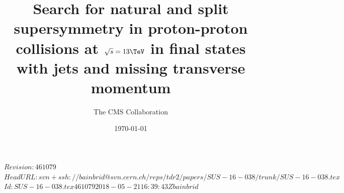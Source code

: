 \RCS$Revision: 461079 $
\RCS$HeadURL: svn+ssh://bainbrid@svn.cern.ch/reps/tdr2/papers/SUS-16-038/trunk/SUS-16-038.tex $
\RCS$Id: SUS-16-038.tex 461079 2018-05-21 16:39:43Z bainbrid $

\providecommand{\CL}{CL\xspace}
\providecommand{\NA}{\ensuremath{\text{---}}}
\newcommand{\ph}[1]{\phantom{#1}}
\newcommand{\tf}{\ensuremath{\mathcal{R}}\xspace}
\newcommand{\cls}{\ensuremath{\text{\CL}_\text{s}}\xspace}
\newcommand{\jet}[1]{\ensuremath{\mathrm{j}_\text{#1}}\xspace}
\newcommand{\fh}{\ensuremath{f_{\mathrm{h}^{\pm}}}\xspace}
\newcommand{\fhleadjet}{\ensuremath{f_{\mathrm{h}^{\pm}}^{\jet{1}}}\xspace}
\newcommand{\ate}{\ensuremath{\mathcal{A}\varepsilon}\xspace}
\newcommand{\ctau}{\ensuremath{c\tau_{0}}\xspace}
\newcommand{\um}{\ensuremath{\,{\mu}\mathrm{m}}\xspace}
\newcommand{\njet}{\ensuremath{n_{\text{jet}}}\xspace}
\newcommand{\nb}{\ensuremath{n_{\mathrm{b}}}\xspace}
\newcommand{\scalht}{\ensuremath{H_{\mathrm{T}}}\xspace}
\newcommand{\alphat}{\ensuremath{\alpha_{\mathrm{T}}}\xspace}
\newcommand{\bdphi}{\ensuremath{\Delta\phi^{*}_\text{min}}\xspace}
\newcommand{\bdphimod}{\ensuremath{\Delta\phi^{*_{\, 25}}_\text{min}}\xspace}
\newcommand{\mhtmet}{\ensuremath{\mht / \ptmiss}\xspace}
\newcommand{\jets}{\ensuremath{\text{jets}}}
\newcommand{\mj}{\ensuremath{\mu\text{+\jets}}\xspace}
\newcommand{\mmj}{\ensuremath{\mu\mu\text{+\jets}}\xspace}
\newcommand{\gj}{\ensuremath{\gamma\text{+\jets}}\xspace}
\newcommand{\znunu}{\ensuremath{\cPZ \to \cPgn\cPagn}\xspace}
\newcommand{\znunuj}{\ensuremath{\cPZ(\to \cPgn\cPagn)\text{+\jets}}\xspace}
\newcommand{\zj}{\ensuremath{\cPZ\text{+\jets}}\xspace}
\newcommand{\wj}{\ensuremath{\PW\text{+\jets}}\xspace}
\newcommand{\wmj}{\ensuremath{\PW(\to\mu\nu)\text{+\jets}}\xspace}
\newcommand{\lost}{\ensuremath{\ell_\text{lost}}\xspace}



\title{Search for natural and split supersymmetry in proton-proton
  collisions at $\sqrt{s} = 13\TeV$ in final states with jets and
  missing transverse momentum}

\author[cern]{The CMS Collaboration}
\address[cern]{CERN}

\date{\today}

